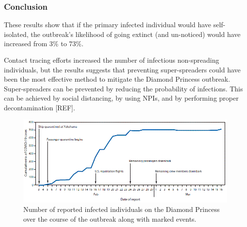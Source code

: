 \documentclass[sr]{drdc-report}
\begin{document}
\subsubsection{Conclusion}
These results show that if the primary infected individual would have self-isolated, the outbreak's likelihood of going extinct (and un-noticed) would have increased from 3\% to 73\%. 

Contact tracing efforts increased the number of infectious non-spreading individuals, but the results suggests that preventing super-spreaders could have been the most effective method to mitigate the Diamond Princess outbreak. Super-spreaders can be prevented by reducing the probability of infections. This can be achieved by social distancing, by using NPIs, and by performing proper decontamination [REF].

\begin{figure}
  \includegraphics[width=0.99\textwidth, keepaspectratio=true]{figures/chrono_DP}
  \caption{Number of reported infected individuals on the Diamond Princess over the course of the outbreak along with marked events.}\label{fig_chrono_DP}
\end{figure}
\end{document}
